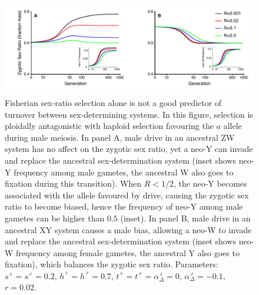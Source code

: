 \documentclass[12pt]{article}
\begin{document}
\begin{figure}[!h]
\centering
\includegraphics[width=\linewidth]{Temporal_SR_Mike}
\caption{
Fisherian sex-ratio selection alone is not a good predictor of turnover between sex-determining systems.
In this figure, selection is ploidally antagonistic with haploid selection favouring the $a$ allele during male meiosis.
In panel A, male drive in an ancestral ZW system has no affect on the zygotic sex ratio, yet a neo-Y can invade and replace the ancestral sex-determination system (inset shows neo-Y frequency among male gametes, the ancestral W also goes to fixation during this transition). 
When $R<1/2$, the neo-Y becomes associated with the allele favoured by drive, causing the zygotic sex ratio to become biased, hence the frequency of neo-Y among male gametes can be higher than $0.5$ (inset).
In panel B, male drive in an ancestral XY system causes a male bias, allowing a neo-W to invade and replace the ancestral sex-determination system (inset shows neo-W frequency among female gametes, the ancestral Y also goes to fixation), which balances the zygotic sex ratio.
Parameters:  $s^\female =s^\male = 0.2$, $h^\female = h^\male = 0.7$, $t^\female = t^\male = \alpha^\female_\Delta = 0$, $\alpha^\male_\Delta = -0.1$, $r=0.02$.
}
\label{fig:SexRatioBad}
\end{figure}
\end{document}
